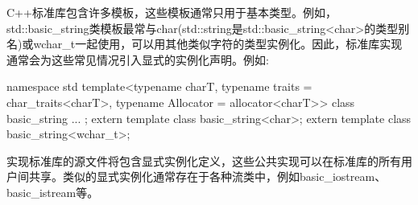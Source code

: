 C++标准库包含许多模板，这些模板通常只用于基本类型。例如，std::basic\_string类模板最常与char(std::string是std::basic\_string<char>的类型别名)或wchar\_t一起使用，可以用其他类似字符的类型实例化。因此，标准库实现通常会为这些常见情况引入显式的实例化声明。例如:

\begin{cpp}
namespace std {
	template<typename charT, typename traits = char_traits<charT>,
	typename Allocator = allocator<charT>>
	class basic_string {
		...
	};
	extern template class basic_string<char>;
	extern template class basic_string<wchar_t>;
}
\end{cpp}

实现标准库的源文件将包含显式实例化定义，这些公共实现可以在标准库的所有用户间共享。类似的显式实例化通常存在于各种流类中，例如basic\_iostream、basic\_istream等。